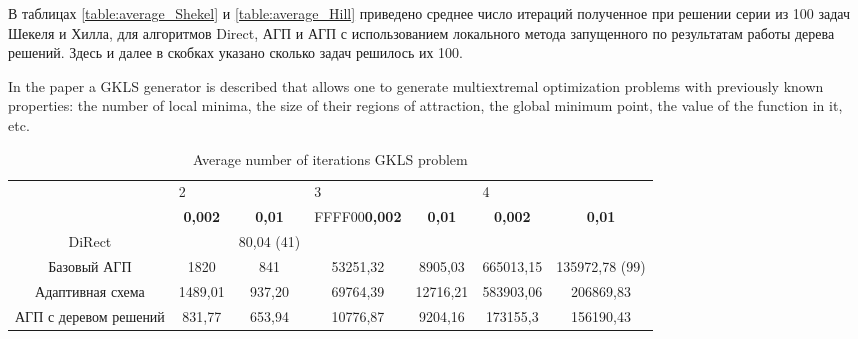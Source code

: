 \documentclass[entropy,article,submit,moreauthors,pdftex]{Definitions/mdpi}
\begin{document}
В таблицах \ref{table:average_Shekel} и \ref{table:average_Hill} приведено среднее число итераций полученное при решении серии из 100 задач Шекеля и Хилла, для алгоритмов Direct, АГП и АГП с использованием локального метода запущенного по результатам работы дерева решений. Здесь и далее в скобках указано сколько задач решилось их 100.


In the paper \cite{Gaviano2003} a GKLS generator is described that allows one to generate multiextremal optimization problems with previously known properties: the number of local minima, the size of their regions of attraction, the global minimum point, the value of the function in it, etc.

\begin{table}[]
	\caption{Average number of iterations GKLS problem}\label{table:average_GKLS}
	\center
\begin{tabular}{ccccccc}
\hline\noalign{\smallskip}

                      & \multicolumn{2}{l}{2}                                                          & \multicolumn{2}{l}{3}                                                          & \multicolumn{2}{l}{4}                                  \\
                      & \textbf{0,002} & \textbf{0,01} & {FFFF00}\textbf{0,002} & \textbf{0,01} & \textbf{0,002} & \textbf{0,01} \\
DiRect                &                                        & 80,04 (41)                            &                                        &                                       &                &                                       \\
Базовый АГП           & 1820                                   & 841                                   & 53251,32                               & 8905,03                               & 665013,15      & 135972,78 (99)                        \\
Адаптивная схема      & 1489,01                                & 937,20                                & 69764,39                               & 12716,21                              & 583903,06      & 206869,83                             \\
АГП с деревом решений & 831,77                                 & 653,94                                & 10776,87                               & 9204,16                               & 173155,3       & 156190,43                            
\end{tabular}
\end{table}
\end{document}
